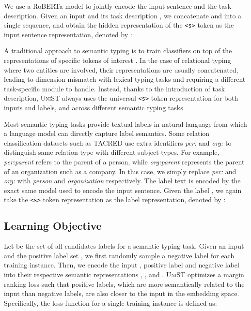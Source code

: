 \documentclass[11pt]{article}
\newcommand{\model}{\textsc{UniST}\xspace}
\newcommand{\stitle}[1]{\vspace{1ex} \noindent{\bf #1}}
\begin{document}
\stitle{Input Representation.}
We use a RoBERTa model \cite{liu2019roberta} to jointly encode the input sentence and the task description. Given an input  and its task description , we concatenate  and  into a single sequence, and obtain the hidden representation of the \texttt{<s>} token as the input sentence representation, denoted by :

A traditional approach to semantic typing is to train classifiers on top of the representations of specific tokens of interest \cite{wang-etal-2021-k,yamada-etal-2020-luke}. In the case of relational typing where two entities are involved, their representations are usually concatenated, leading to dimension mismatch with lexical typing tasks and requiring a different task-specific module to handle.
Instead, thanks to the introduction of task description, \model always uses the universal \texttt{<s>} token representation for both inputs and labels, and across different semantic typing tasks.


\stitle{Label Representation.}
Most semantic typing tasks provide textual labels in natural language from which a language model can directly capture label semantics. Some relation classification datasets such as TACRED use extra identifiers \textit{per:} and \textit{org:} to distinguish same relation type with different subject types. For example, \textit{per:parent} refers to the parent of a person, while \textit{org:parent} represents the parent of an organization such as a company. In this case, we simply replace \textit{per:} and \textit{org:} with \textit{person} and \textit{organization} respectively. The label text is encoded by the exact same model used to encode the input sentence. Given the label , we again take the \texttt{<s>} token representation as the label representation, denoted by :




\subsection{Learning Objective} \label{train}
Let  be the set of all candidates labels for a semantic typing task. Given an input  and the positive label set , we first randomly sample a negative label  for each training instance. Then, we encode the input , positive label  and negative label  into their respective semantic representations , , and . \model optimizes a margin ranking loss such that positive labels, which are more semantically related to the input than negative labels, are also closer to the input in the embedding space. Specifically, the loss function for a single training instance is defined as:
\end{document}
